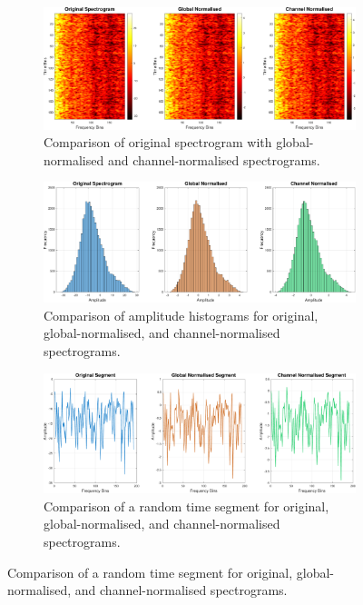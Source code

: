 \begin{figure}[htbp]
    \centering
    \begin{subfigure}[t]{\textwidth}
        \centering
        \includegraphics[width=\textwidth]{img/ch4/spectrogramComparison.pdf}
        \caption{Comparison of original spectrogram with global-normalised and channel-normalised spectrograms.}
        \label{fig:normalisation-spectrogram}
    \end{subfigure}
    
    \vspace{1cm}
    
    \begin{subfigure}[t]{\textwidth}
        \centering
        \includegraphics[width=\textwidth]{img/ch4/histogramComparison.pdf}
        \caption{Comparison of amplitude histograms for original, global-normalised, and channel-normalised spectrograms.}
        \label{fig:normalisation-histogram}
    \end{subfigure}
    
    \vspace{1cm}
    
    \begin{subfigure}[t]{\textwidth}
        \centering
        \includegraphics[width=\textwidth]{img/ch4/timeSegmentComparison.pdf}
        \caption{Comparison of a random time segment for original, global-normalised, and channel-normalised spectrograms.}
        \label{fig:normalisation-time-segment}
    \end{subfigure}


\end{figure}
